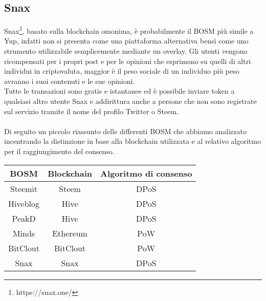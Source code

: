 \subsection{Snax}
Snax\footnote{https://snax.one/}, basato sulla blockchain omonima, è probabilmente il BOSM più simile a Yup, infatti non si presenta come una piattaforma alternativa bensì come uno strumento utilizzabile semplicemente mediante un overlay. 
Gli utenti vengono ricompensati per i propri post e per le opinioni che esprimono su quelli di altri individui in criptovaluta, maggior è il peso sociale di un individuo più peso avranno i suoi contenuti e le sue opinioni.
\\
Tutte le transazioni sono gratis e istantanee ed è possibile inviare token a qualsiasi altro utente Snax e addirittura anche a persone che non sono registrate sul servizio tramite il nome del profilo Twitter o Steem.
\\
\\
Di seguito un piccolo riassunto delle differenti BOSM che abbiamo analizzato incentrando la distinzione in base alla blockchain utilizzata e al relativo algoritmo per il raggiungimento del consenso.
\begin{center}
\begin{tabular}{ |c|c|c| }
 \hline
 BOSM & Blockchain & Algoritmo di consenso \\
 \hline
 Steemit & Steem & DPoS \\
 \hline
 Hiveblog & Hive & DPoS \\
 \hline
 PeakD & Hive & DPoS \\
 \hline
 Minds & Ethereum & PoW \\
 \hline
 BitClout & BitClout & PoW \\
 \hline
 Snax & Snax & DPoS \\
 \hline
\end{tabular}
\end{center}


